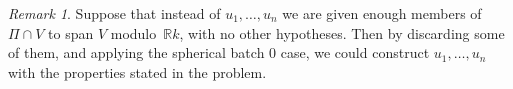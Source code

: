 \documentclass[12pt]{amsart}
\def\twobytwo#1#2#3#4{\bigl(\begin{smallmatrix}#1&#2\\#3&#4\end{smallmatrix}\bigr)
    }
\def\gend#1{\langle#1\rangle}
\def\R{\mathbb{R}}
\let\iso\cong
\def\cong{\equiv}
\numberwithin{theorem}{section}
\numberwithin{equation}{section}
\numberwithin{figure}{section}
\theoremstyle{remark}
\newtheorem{remark}[theorem]{Remark}
\begin{document}
\begin{remark}
    Suppose that instead of $u_1,\dots,u_n$
    we are given enough members of $\Pi\cap V$ to span $V$ modulo~$\R k$,
    with no other hypotheses.  Then by discarding some of them,
    and applying the spherical batch $0$ case, we could construct
    $u_1,\dots,u_n$ with the properties stated in the problem.  
\end{remark}

\end{document}
